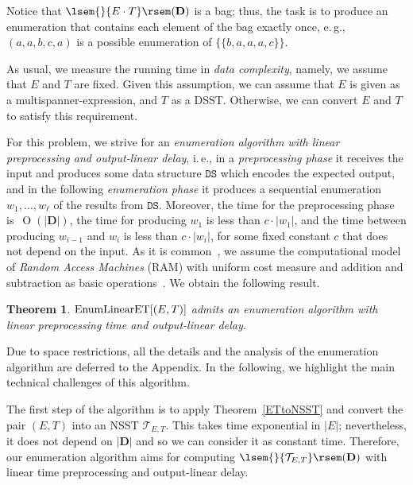 \documentclass[
a4paper
]{article}
\theoremstyle{plain}
\newtheorem{theorem}{Theorem}[section]
\theoremstyle{definition}
\theoremstyle{remark}
\newcommand{\doc}{\ensuremath{\mathbf{D}}}
\newcommand{\nsst}{\mathcal{T}}
\newcommand{\sem}[1]{{\lsem{}{#1}\rsem}}
\newcommand{\multiset}[1]{\{\!\!\{#1\}\!\!\}}
\DeclareMathOperator{\bigo}{O}
\begin{document}
\noindent Notice that $\sem{E \cdot T}(\doc)$ is a bag; thus, the task is to produce an enumeration that contains each element of the bag exactly once, e.\,g., $(a, a, b, c, a)$ is a possible enumeration of $\multiset{b, a, a, a, c}$.

As usual,
we measure the running time in \emph{data complexity}, namely, we assume that $E$ and $T$ are fixed. Given this assumption, we can assume that $E$ is given as a multispanner-expression, and $T$ as a DSST. Otherwise, we can convert $E$ and $T$ to satisfy this requirement. 

For this problem, we strive for an \emph{enumeration algorithm with linear preprocessing and output-linear delay}, i.\,e., in a \emph{preprocessing phase} it receives the input and produces some data structure $\texttt{DS}$ which encodes the expected output, and in the following \emph{enumeration phase} it produces a sequential enumeration $w_1, \ldots, w_\ell$ of the results from $\texttt{DS}$. Moreover, the time for the preprocessing phase is~$\bigo(|\doc|)$, the time for producing $w_1$
is less than $c\cdot |w_1|$, and the time between producing $w_{i-1}$ and $w_i$ is less than $c \cdot |w_i|$, for some fixed constant $c$ that does not depend on the input. As it is common~\cite{Segoufin13},
we assume the computational model of \emph{Random Access Machines} (RAM) with uniform cost measure and addition and subtraction as basic operations~\cite{aho1974design}. 
We obtain the following result.

\begin{theorem}\label{theo:enum}
$\textsc{\upshape{EnumLinearET}}[(E, T)]$ admits an enumeration algorithm with linear preprocessing time and output-linear delay.
\end{theorem}

Due to space restrictions, all the details and the analysis of the enumeration algorithm are deferred to the Appendix.
In the following, we
highlight
the main technical challenges of this algorithm.

\newcommand{\nsstET}{\nsst_{E,T}}

The first step of the algorithm is to apply Theorem~\ref{ETtoNSST} and convert the pair $(E,T)$ into an NSST $\nsstET$. This takes time exponential in $|E|$;
nevertheless, it does not depend on $|\doc|$ and so we can consider it as constant time. Therefore, our enumeration algorithm aims for computing $\sem{\nsstET}(\doc)$ with linear time preprocessing and output-linear delay. 
\end{document}
